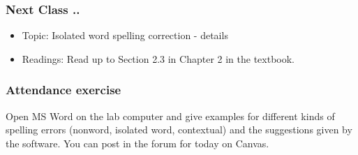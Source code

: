 \documentclass{beamer}
\begin{document}
\begin{frame}
\frametitle{Next Class ..} 
\begin{itemize}
\item Topic: Isolated word spelling correction - details
\item Readings: Read up to Section 2.3 in Chapter 2 in the textbook.
\end{itemize}
\end{frame}

\begin{frame}
\frametitle{Attendance exercise}
Open MS Word on the lab computer and give examples for different kinds of spelling errors (nonword, isolated word, contextual) and the suggestions given by the software. You can post in the forum for today on Canvas. 
\end{frame}
\end{document}
